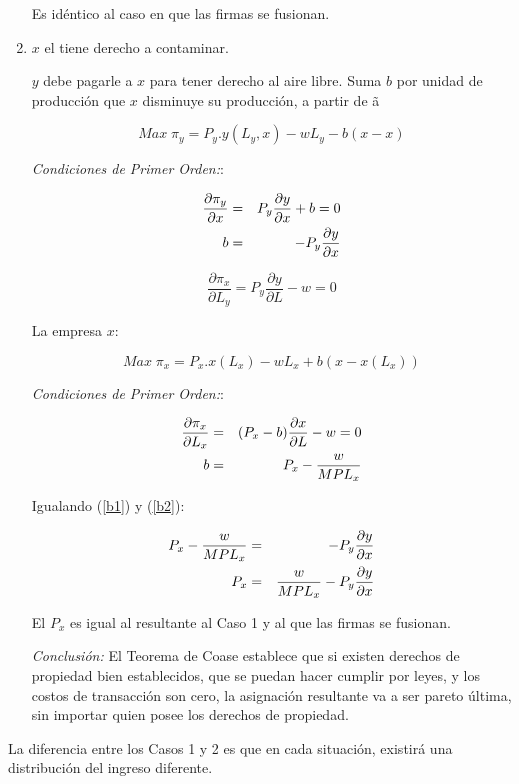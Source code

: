 \begin{enumerate}
Es idéntico al caso en que las firmas se fusionan.

\item $x$ el tiene derecho a contaminar.

$y$ debe pagarle a $x$ para tener derecho al aire libre. Suma $b$
por unidad de producción que $x$ disminuye su producción, a partir
de \~{a}

$$Max \; \pi_y=P_y. y(L_y,x)-wL_y-b(x-x)$$

\emph{Condiciones de Primer Orden:}:

\begin{eqnarray}
\frac{\partial \pi_y}{\partial x} &=& P_y \frac{\partial y}{\partial
x}+b=0 \nonumber \\
b & = & -P_y \frac{\partial y}{\partial x} \label{b1}
\end{eqnarray}

$$\frac{\partial\pi_x}{\partial L_y}=P_y\frac{\partial y}{\partial
L}-w=0$$

La empresa $x$:

$$Max \; \pi_x=P_x.x(L_x)-wL_x+b(x-x(L_x))$$

\emph{Condiciones de Primer Orden:}:

\begin{eqnarray}
\frac{\partial \pi_x}{\partial L_x} &=& (P_x-b) \frac{\partial
x}{\partial L}-w=0 \nonumber \\
b & = & P_x- \frac{w}{MPL_x} \label{b2}
\end{eqnarray}

Igualando (\ref{b1}) y (\ref{b2}):

\begin{eqnarray}
P_x- \frac{w}{MPL_x} &=& -P_y \frac{\partial y}{\partial x} \nonumber \\
P_x &=& \frac{w}{MPL_x}-P_y \frac{\partial y}{\partial x}
\end{eqnarray}

El $P_x$ es igual al resultante al Caso 1 y al que las firmas se
fusionan.

\emph{Conclusión:}  El Teorema de Coase establece que si existen
derechos de propiedad bien establecidos, que se puedan hacer cumplir
por leyes, y los costos de transacción son cero, la asignación
resultante va a ser pareto última, sin importar quien posee los
derechos de propiedad.
\end{enumerate}

La diferencia entre los Casos 1 y 2 es que en cada situación,
existirá una distribución del ingreso diferente.
